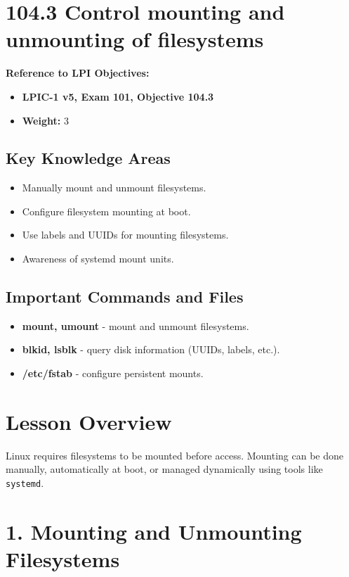 \documentclass[a4paper]{report}
\begin{document}
\section*{104.3 Control mounting and unmounting of filesystems}

\textbf{Reference to LPI Objectives:}
\begin{itemize}
    \item \textbf{LPIC-1 v5, Exam 101, Objective 104.3}
    \item \textbf{Weight:} 3
\end{itemize}

\subsection*{Key Knowledge Areas}
\begin{itemize}
    \item Manually mount and unmount filesystems.
    \item Configure filesystem mounting at boot.
    \item Use labels and UUIDs for mounting filesystems.
    \item Awareness of systemd mount units.
\end{itemize}

\subsection*{Important Commands and Files}
\begin{itemize}
    \item \textbf{mount, umount} \text{-}- mount and unmount filesystems.
    \item \textbf{blkid, lsblk} \text{-}- query disk information (UUIDs, labels, etc.).
    \item \textbf{/etc/fstab} \text{-}- configure persistent mounts.
\end{itemize}

\section*{Lesson Overview}

Linux requires filesystems to be mounted before access. Mounting can be done manually, automatically at boot, or managed dynamically using tools like \texttt{systemd}.

\section*{1. Mounting and Unmounting Filesystems}
\end{document}
